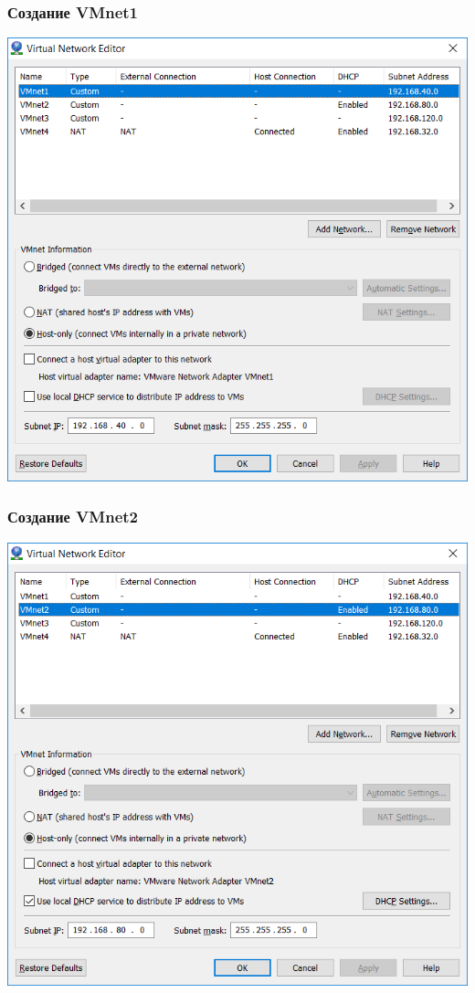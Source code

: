 \documentclass[9pt, compress]{beamer}
\begin{document}
\begin{frame}
\frametitle{Создание VMnet1}
\begin{center}  
	\includegraphics[width=.72\textwidth]{img/vmnet_1}
\end{center}
\end{frame}

\begin{frame}
\frametitle{Создание VMnet2}
\begin{center}  
	\includegraphics[width=.72\textwidth]{img/vmnet_2}
\end{center}
\end{frame}
\end{document}
